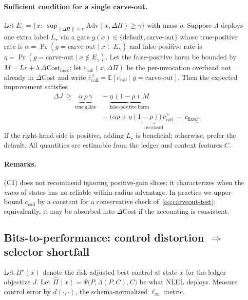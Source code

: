 \documentclass{article}
\theoremstyle{plain}
\theoremstyle{definition}
\theoremstyle{remark}
\begin{document}
\paragraph{Sufficient condition for a single carve-out.}
Let $E_\gamma=\{x:\ \sup_{\|\Delta\Pi\|\le r}\mathrm{Adv}(x,\Delta\Pi)\ge \gamma\}$ with mass $\rho$. 
Suppose $\Lambda$ deploys one extra label $L_\star$ via a gate $g(x)\in\{\text{default},\text{carve-out}\}$ whose true-positive rate is $\alpha=\Pr(g=\text{carve-out}\mid x\in E_\gamma)$ and false-positive rate is $\eta=\Pr(g=\text{carve-out}\mid x\notin E_\gamma)$. 
Let the false-positive harm be bounded by $M=Lr+\lambda\,\Delta\mathrm{Cost}_{\max}$; let $c_{\text{call}}(x,\Delta\Pi)$ be the per-invocation overhead not already in $\Delta\mathrm{Cost}$ and write $\bar c_{\text{call}}^{+}=\mathbb{E}[c_{\text{call}}\mid g=\text{carve-out}]$. 
Then the expected improvement satisfies
\begin{align*}
\Delta J\ \ge\ \underbrace{\alpha\,\rho\,\gamma}_{\text{true gains}}
  \ &-\ \underbrace{\eta\,(1-\rho)\,M}_{\text{false-positive harm}} \\
  \ &-\ \underbrace{\big(\alpha\rho+\eta(1-\rho)\big)\,\bar c_{\text{call}}^{+}\ -\ c_{\text{fixed}}}_{\text{overhead}}.
\label{eq:carveout-test}
\end{align*}
If the right-hand side is positive, adding $L_\star$ is beneficial; otherwise, prefer the default. 
All quantities are estimable from the ledger and context features $C$.

\paragraph{Remarks.}
(C1) does not recommend ignoring positive-gain slices; it characterizes when the \emph{mass} of states has no reliable within-radius advantage. 
In practice we upper-bound $c_{\text{call}}$ by a constant for a conservative check of~\eqref{eq:carveout-test}; equivalently, it may be absorbed into $\Delta\mathrm{Cost}$ if the accounting is consistent.

\subsection{Bits-to-performance: control distortion $\Rightarrow$ selector shortfall}

Let $\Pi^\star(x)$ denote the risk-adjusted best control at state $x$ for the ledger objective $J$. 
Let $\widehat{\Pi}(x)=\Psi\big(P,\Lambda(P,C),C\big)$ be what NLEL deploys. 
Measure control error by $d(\cdot,\cdot)$, the schema-normalized $\ell_\infty$ metric.
\end{document}
